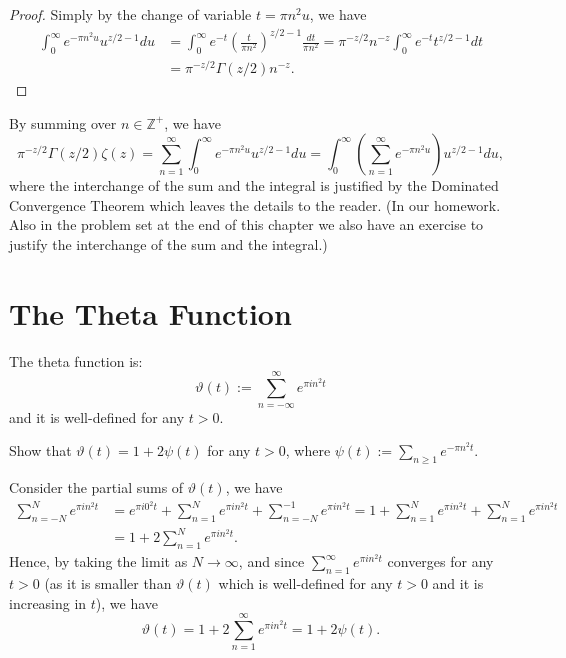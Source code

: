 \documentclass{elegantbook}
\begin{document}
\begin{proof}
  Simply by the change of variable $t = \pi n^2 u$, we have
  \[
  \begin{aligned}
    \int_{0}^{\infty} e^{-\pi n^2 u }u^{z/2 - 1} du &= \int_{0}^{\infty} e^{-t} \left( \frac{t}{\pi n^2} \right)^{z/2 - 1} \frac{dt}{\pi n^2} = \pi^{-z/2} n^{-z} \int_{0}^{\infty} e^{-t} t^{z/2 - 1} dt \\
    &= \pi^{-z/2} \Gamma(z/2) n^{-z}.
  \end{aligned}
  \]
\end{proof}

\begin{remark}
  By summing over $n\in\mathbb{Z}^+$, we have
  \[
    \pi^{-z/2} \Gamma(z/2) \zeta(z) = \sum_{n=1}^{\infty} \int_{0}^{\infty} e^{-\pi n^2 u }u^{z/2 - 1} du = \int_{0}^{\infty} \left( \sum_{n=1}^{\infty} e^{-\pi n^2 u } \right) u^{z/2 - 1} du,
  \]
  where the interchange of the sum and the integral is justified by the Dominated Convergence Theorem which leaves the details to the reader. (In our homework. Also in the problem set at the end of this chapter we also have an exercise to justify the interchange of the sum and the integral.)
\end{remark}


\section{The Theta Function}

\begin{definition}
  The theta function is:
  \[
    \vartheta(t) := \sum_{n=-\infty}^{\infty} e^{\pi i n^2 t}
  \]
  and it is well-defined for any $t>0$.
\end{definition}

\begin{exercise}
  Show that $\vartheta(t) = 1 + 2\psi(t)$ for any $t>0$, where $\psi(t) := \sum_{n\geq 1}e^{-\pi n^2 t}$.
\end{exercise}

\begin{solution}
  Consider the partial sums of $\vartheta(t)$, we have
  \[
  \begin{aligned}
    \sum_{n=-N}^{N} e^{\pi i n^2 t} &= e^{\pi i 0^2 t} + \sum_{n=1}^{N} e^{\pi i n^2 t} + \sum_{n=-N}^{-1} e^{\pi i n^2 t} = 1 + \sum_{n=1}^{N} e^{\pi i n^2 t} + \sum_{n=1}^{N} e^{\pi i n^2 t} \\
    &= 1 + 2\sum_{n=1}^{N} e^{\pi i n^2 t}.
  \end{aligned}
  \]
  Hence, by taking the limit as $N \to \infty$, and since $\sum_{n=1}^{\infty} e^{\pi i n^2 t}$ converges for any $t>0$ (as it is smaller than $\vartheta(t)$ which is well-defined for any $t>0$ and it is increasing in $t$), we have
  \[
    \vartheta(t) = 1 + 2\sum_{n=1}^{\infty} e^{\pi i n^2 t} = 1 + 2\psi(t).
  \]
\end{solution}
\end{document}
